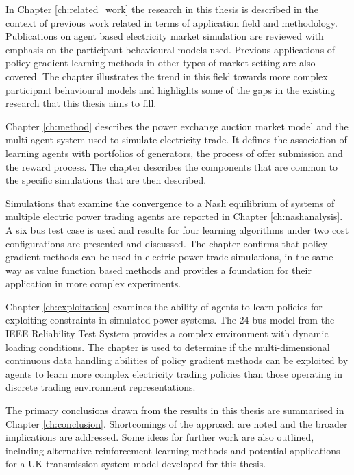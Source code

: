 In Chapter \ref{ch:related_work} the research in this thesis is described in the
context of previous work related in terms of application field and
methodology.  Publications on agent based electricity market simulation are
reviewed with emphasis on the participant behavioural models used. Previous
applications of policy gradient learning methods in other types of market
setting are also covered.  The chapter illustrates the trend in this field
towards more complex participant behavioural models and highlights some of the
gaps in the existing research that this thesis aims to fill.

Chapter \ref{ch:method} describes the power exchange auction market model and
the multi-agent system used to simulate electricity trade.  It defines the
association of learning agents with portfolios of generators, the process of
offer submission and the reward process. The chapter describes the components
that are common to the specific simulations that are then described.

Simulations that examine the convergence to a Nash equilibrium of systems of
multiple electric power trading agents are reported in Chapter
\ref{ch:nashanalysis}. A six bus test case is used and results for four learning
algorithms under two cost configurations are presented and discussed. The
chapter confirms that policy gradient methods can be used in electric power trade
simulations, in the same way as value function based methods and provides a
foundation for their application in more complex experiments.

Chapter \ref{ch:exploitation} examines the ability of agents to learn policies
for exploiting constraints in simulated power systems.  The 24 bus model from
the IEEE Reliability Test System provides a complex environment with dynamic
loading conditions. The chapter is used to determine if the multi-dimensional
continuous data handling abilities of policy gradient methods can be exploited
by agents to learn more complex electricity trading policies than those
operating in discrete trading environment representations.

The primary conclusions drawn from the results in this thesis are summarised
in Chapter \ref{ch:conclusion}.  Shortcomings of the approach are noted and
the broader implications are addressed.  Some ideas for further work are also
outlined, including alternative reinforcement learning methods and potential
applications for a UK transmission system model developed for this thesis.


